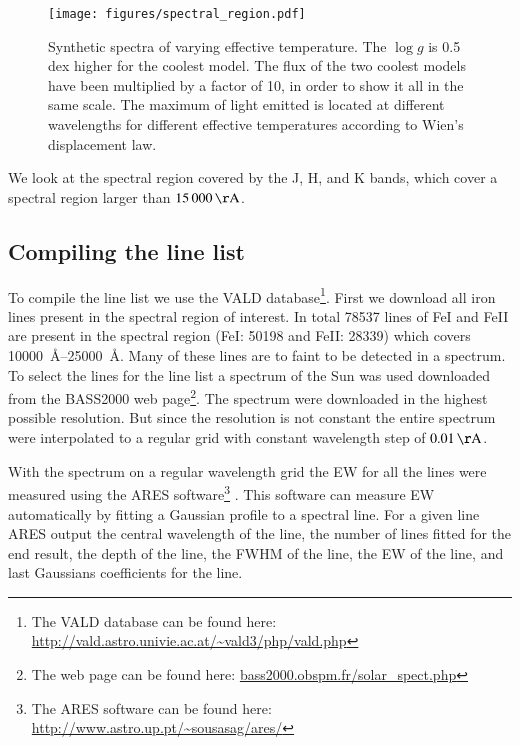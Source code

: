 \documentclass{aa}
\begin{document}
\begin{figure}[htbp!]
    \centering
    \texttt{[image: figures/spectral\_region.pdf]}
    \caption{Synthetic spectra of varying effective temperature. The $\log g$
    is 0.5 dex higher for the coolest model. The flux of the two coolest models
    have been multiplied by a factor of 10, in order to show it all in the same
    scale. The maximum of light emitted is located at different wavelengths for
    different effective temperatures according to Wien's displacement law.}
    \label{fig:spectral_region}
\end{figure}

We look at the spectral region covered by the J, H, and K bands, which cover a
spectral region larger than $\SI{15000}{\AA}$.



\subsection{Compiling the line list}

To compile the line list we use the VALD
database\footnote{The VALD database can be found here:
\url{http://vald.astro.univie.ac.at/~vald3/php/vald.php}}. First
we download all iron lines present in the spectral region of
interest. In total 78537 lines of FeI and FeII are present in
the spectral region (FeI: 50198 and FeII: 28339) which covers
\SIrange{10000}{25000}{\angstrom}. Many of these lines are to
faint to be detected in a spectrum. To select the lines for
the line list a spectrum of the Sun was used downloaded from
the BASS2000 web page\footnote{The web page can be found here:
\url{bass2000.obspm.fr/solar_spect.php}}. The spectrum were downloaded
in the highest possible resolution. But since the resolution is not
constant the entire spectrum were interpolated to a regular grid with
constant wavelength step of $\SI{0.01}{\AA}$.

With the spectrum on a regular wavelength grid the
EW for all the lines were measured using the ARES
software\footnote{The ARES software can be found here:
\url{http://www.astro.up.pt/~sousasag/ares/}}\citep{Sousa2007,Sousa2015}
. This software can measure EW automatically by fitting a Gaussian
profile to a spectral line. For a given line ARES output the central
wavelength of the line, the number of lines fitted for the end result,
the depth of the line, the FWHM of the line, the EW of the line, and
last Gaussians coefficients for the line.
\end{document}
